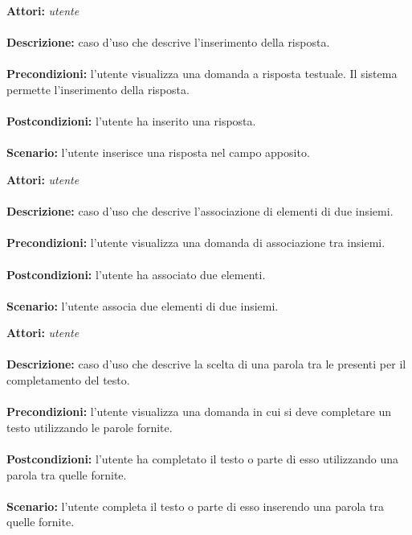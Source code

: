 \documentclass[a4paper,11pt]{article}
\begin{document}

\textbf{Attori:} \textit{utente}
\\ \\
\textbf{Descrizione:} caso d'uso che descrive l'inserimento della risposta.\\
\\
\textbf{Precondizioni:} l'utente visualizza una domanda a risposta testuale. Il sistema permette l'inserimento della risposta.\\
\\
\textbf{Postcondizioni:} l'utente ha inserito una risposta.\\
\\
\textbf{Scenario:} l’utente inserisce una risposta nel campo apposito.\\



\textbf{Attori:} \textit{utente}
\\ \\
\textbf{Descrizione:} caso d'uso che descrive l'associazione di elementi di due insiemi.\\
\\
\textbf{Precondizioni:} l'utente visualizza una domanda di associazione tra insiemi.\\
\\
\textbf{Postcondizioni:} l'utente ha associato due elementi.\\
\\
\textbf{Scenario:} l’utente associa due elementi di due insiemi.\\



\textbf{Attori:} \textit{utente}
\\ \\
\textbf{Descrizione:} caso d'uso che descrive la scelta di una parola tra le presenti per il completamento del testo.\\
\\
\textbf{Precondizioni:} l'utente visualizza una domanda in cui si deve completare un testo utilizzando le parole fornite.\\
\\
\textbf{Postcondizioni:} l'utente ha completato il testo o parte di esso utilizzando una parola tra quelle fornite.\\
\\
\textbf{Scenario:} l’utente completa il testo o parte di esso inserendo una parola tra quelle fornite.\\
\end{document}
